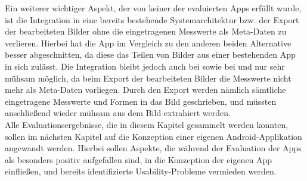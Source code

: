 Ein weiterer wichtiger Aspekt, der von keiner der evaluierten Apps erfüllt wurde, ist die Integration in eine bereits bestehende Systemarchitektur bzw. der Export der bearbeiteten Bilder ohne die eingetragenen Messwerte als Meta-Daten zu verlieren. 
Hierbei hat die App \im{} im Vergleich zu den anderen beiden Alternative besser abgeschnitten, da diese das Teilen von Bilder aus einer bestehenden App in sich zulässt.
Die Integration bleibt jedoch auch bei \im{} sowie bei \mm{} und \pm{} nur sehr mühsam möglich, da beim Export der bearbeiteten Bilder die Messwerte nicht mehr als Meta-Daten vorliegen.
Durch den Export werden nämlich sämtliche eingetragene Messwerte und Formen in das Bild geschrieben, und müssten anschließend wieder mühsam aus dem Bild extrahiert werden. \\

Alle Evaluationsergebnisse, die in diesem Kapitel gesammelt werden konnten, sollen im nächsten Kapitel auf die Konzeption einer eigenen Android-Applikation angewandt werden.
Hierbei sollen Aspekte, die während der Evaluation der Apps als besonders positiv aufgefallen sind, in die Konzeption der eigenen App einfließen, und bereits identifizierte Usability-Probleme vermieden werden.
